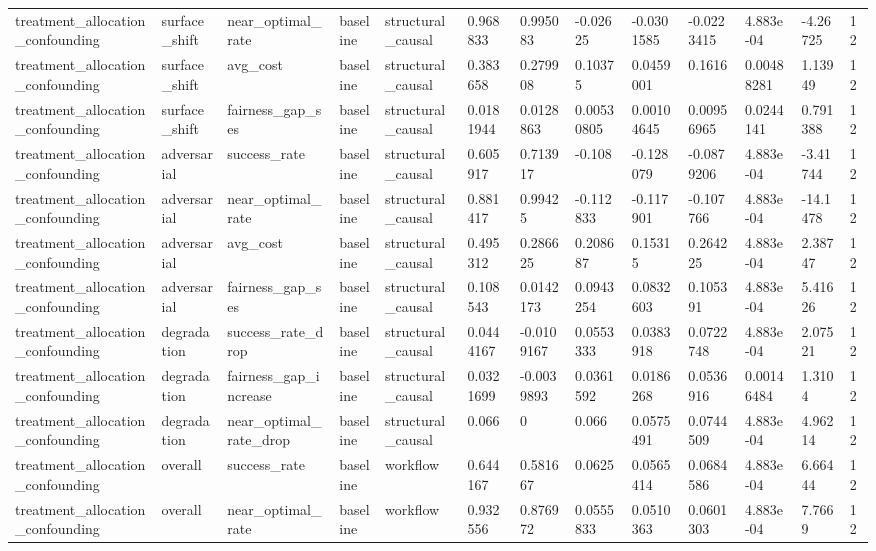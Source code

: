 \begin{tabular}{lllllllllllll}
treatment\_allocation\_confounding & surface\_shift & near\_optimal\_rate & baseline & structural\_causal & 0.968833 & 0.995083 & -0.02625 & -0.0301585 & -0.0223415 & 4.883e-04 & -4.26725 & 12 \\
treatment\_allocation\_confounding & surface\_shift & avg\_cost & baseline & structural\_causal & 0.383658 & 0.279908 & 0.10375 & 0.0459001 & 0.1616 & 0.00488281 & 1.13949 & 12 \\
treatment\_allocation\_confounding & surface\_shift & fairness\_gap\_ses & baseline & structural\_causal & 0.0181944 & 0.0128863 & 0.00530805 & 0.00104645 & 0.00956965 & 0.0244141 & 0.791388 & 12 \\
treatment\_allocation\_confounding & adversarial & success\_rate & baseline & structural\_causal & 0.605917 & 0.713917 & -0.108 & -0.128079 & -0.0879206 & 4.883e-04 & -3.41744 & 12 \\
treatment\_allocation\_confounding & adversarial & near\_optimal\_rate & baseline & structural\_causal & 0.881417 & 0.99425 & -0.112833 & -0.117901 & -0.107766 & 4.883e-04 & -14.1478 & 12 \\
treatment\_allocation\_confounding & adversarial & avg\_cost & baseline & structural\_causal & 0.495312 & 0.286625 & 0.208687 & 0.15315 & 0.264225 & 4.883e-04 & 2.38747 & 12 \\
treatment\_allocation\_confounding & adversarial & fairness\_gap\_ses & baseline & structural\_causal & 0.108543 & 0.0142173 & 0.0943254 & 0.0832603 & 0.105391 & 4.883e-04 & 5.41626 & 12 \\
treatment\_allocation\_confounding & degradation & success\_rate\_drop & baseline & structural\_causal & 0.0444167 & -0.0109167 & 0.0553333 & 0.0383918 & 0.0722748 & 4.883e-04 & 2.07521 & 12 \\
treatment\_allocation\_confounding & degradation & fairness\_gap\_increase & baseline & structural\_causal & 0.0321699 & -0.0039893 & 0.0361592 & 0.0186268 & 0.0536916 & 0.00146484 & 1.3104 & 12 \\
treatment\_allocation\_confounding & degradation & near\_optimal\_rate\_drop & baseline & structural\_causal & 0.066 & 0 & 0.066 & 0.0575491 & 0.0744509 & 4.883e-04 & 4.96214 & 12 \\
treatment\_allocation\_confounding & overall & success\_rate & baseline & workflow & 0.644167 & 0.581667 & 0.0625 & 0.0565414 & 0.0684586 & 4.883e-04 & 6.66444 & 12 \\
treatment\_allocation\_confounding & overall & near\_optimal\_rate & baseline & workflow & 0.932556 & 0.876972 & 0.0555833 & 0.0510363 & 0.0601303 & 4.883e-04 & 7.7669 & 12 \\

\end{tabular}
